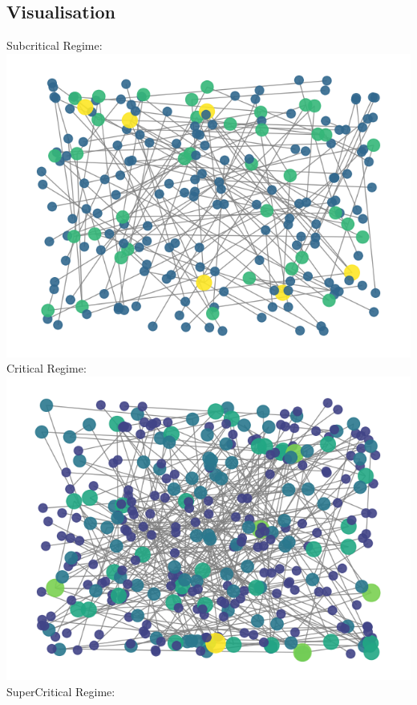 \documentclass[11pt]{article}
\begin{document}
\subsection{Visualisation}
Subcritical Regime:\\
\includegraphics[scale=0.5]{subcgv.png} \\ 
Critical Regime: \\
\includegraphics[scale=0.5]{cgv.png} \\ 
SuperCritical Regime:\\
\end{document}
